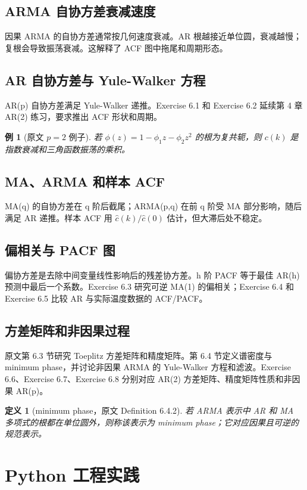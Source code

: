 \documentclass[11pt,a4paper]{ctexart}
\newtheorem{definition}{定义}[section]
\newtheorem{example}{例}[section]
\begin{document}
\subsection{ARMA 自协方差衰减速度}
因果 ARMA 的自协方差通常按几何速度衰减。AR 根越接近单位圆，衰减越慢；复根会导致振荡衰减。这解释了 ACF 图中拖尾和周期形态。

\subsection{AR 自协方差与 Yule-Walker 方程}
AR(p) 自协方差满足 Yule-Walker 递推。Exercise 6.1 和 Exercise 6.2 延续第 4 章 AR(2) 练习，要求推出 ACF 形状和周期。

\begin{example}[原文 \(p=2\) 例子]
若 \(\phi(z)=1-\phi_1z-\phi_2z^2\) 的根为复共轭，则 \(c(k)\) 是指数衰减和三角函数振荡的乘积。
\end{example}

\subsection{MA、ARMA 和样本 ACF}
MA(q) 的自协方差在 q 阶后截尾；ARMA(p,q) 在前 q 阶受 MA 部分影响，随后满足 AR 递推。样本 ACF 用 \(\hat c(k)/\hat c(0)\) 估计，但大滞后处不稳定。

\subsection{偏相关与 PACF 图}
偏协方差是去除中间变量线性影响后的残差协方差。h 阶 PACF 等于最佳 AR(h) 预测中最后一个系数。Exercise 6.3 研究可逆 MA(1) 的偏相关；Exercise 6.4 和 Exercise 6.5 比较 AR 与实际温度数据的 ACF/PACF。

\subsection{方差矩阵和非因果过程}
原文第 6.3 节研究 Toeplitz 方差矩阵和精度矩阵。第 6.4 节定义谱密度与 minimum phase，并讨论非因果 ARMA 的 Yule-Walker 方程和滤波。Exercise 6.6、Exercise 6.7、Exercise 6.8 分别对应 AR(2) 方差矩阵、精度矩阵性质和非因果 AR(p)。

\begin{definition}[minimum phase，原文 Definition 6.4.2]
若 ARMA 表示中 AR 和 MA 多项式的根都在单位圆外，则称该表示为 minimum phase；它对应因果且可逆的规范表示。
\end{definition}

\section{Python 工程实践}
\end{document}
